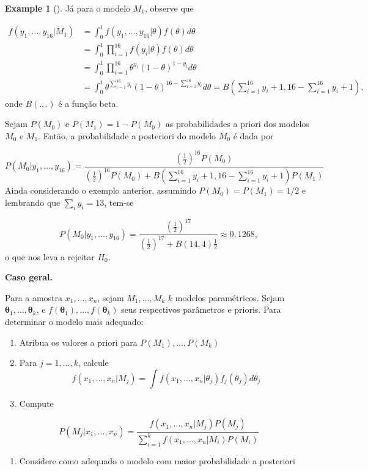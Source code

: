 \documentclass[
  letterpaper,
  DIV=11,
  numbers=noendperiod]{scrreprt}
\providecommand{\tightlist}{%
  \setlength{\itemsep}{0pt}\setlength{\parskip}{0pt}}\usepackage{longtable,booktabs,array}
\theoremstyle{definition}
\theoremstyle{plain}
\theoremstyle{definition}
\newtheorem{example}{Example}[chapter]
\theoremstyle{remark}
\begin{document}
\begin{example}[]
Já para o modelo \(M_1\), observe que

\[\begin{align}f(y_1,\ldots,y_{16}|M_1)&=
\int_0^1 f(y_1,\ldots,y_{16}|\theta)f(\theta)d\theta\\
&=\int_0^1 \prod_{i=1}^{16}f(y_i|\theta)f(\theta)d\theta\\
&=\int_0^1 \prod_{i=1}^{16}\theta^{y_i}(1-\theta)^{1-y_i}d\theta\\
&=\int_0^1\theta^{\sum_{i=1}^{16}y_i}(1-\theta)^{16-\sum_{i=1}^{16}y_i}d\theta=B\left(\sum_{i=1}^{16}y_i+1,16-\sum_{i=1}^{16}y_i+1\right),\end{align}\]
onde \(B(.,.)\) é a função beta.

Sejam \(P(M_0)\) e \(P(M_1)=1-P(M_0)\) as probabilidades a priori dos
modelos \(M_0\) e \(M_1\). Então, a probabilidade a posteriori do modelo
\(M_0\) é dada por

\[P(M_0|y_1,\ldots,y_{16})=\frac{\left(\frac{1}{2}\right)^{16}P(M_0)}{\left(\frac{1}{2}\right)^{16}P(M_0)+B\left(\sum_{i=1}^{16}y_i+1,16-\sum_{i=1}^{16}y_i+1\right)P(M_1)}\]
Ainda considerando o exemplo anterior, assumindo \(P(M_0)=P(M_1)=1/2\) e
lembrando que \(\sum_i y_i=13\), tem-se

\[P(M_0|y_1,\ldots,y_{16})=\frac{\left(\frac{1}{2}\right)^{17}}{\left(\frac{1}{2}\right)^{17}+B\left(14,4\right)\frac{1}{2}}\approx0,1268,\]
o que nos leva a rejeitar \(H_0\).

\textbf{Caso geral.}

Para a amostra \(x_1,\ldots,x_n\), sejam \(M_1,\ldots,M_k\) \(k\)
modelos paramétricos. Sejam
\(\boldsymbol{\theta}_1,\ldots,\boldsymbol{\theta}_k\), e
\(f(\boldsymbol{\theta}_1),\ldots,f(\boldsymbol{\theta}_k)\) seus
respectivos parâmetros e prioris. Para determinar o modelo mais
adequado:

\begin{enumerate}
\def\labelenumi{\arabic{enumi}.}
\item
  Atribua os valores a priori para \(P(M_1),\ldots,P(M_k)\)
\item
  Para \(j=1,\ldots,k\), calcule
  \[f(x_1,\ldots,x_n|M_j)=\int f(x_1,\ldots,x_n|\theta_j)f_j(\theta_j)d\theta_j\]
\item
  Compute
\end{enumerate}

\[P(M_j|x_1,\ldots,x_n)=\frac{f(x_1,\ldots,x_n|M_j)P(M_j)}{\sum_{i=1}^k f(x_1,\ldots,x_n|M_i)P(M_i)}\]

\begin{enumerate}
\def\labelenumi{\arabic{enumi}.}
\setcounter{enumi}{3}
\tightlist
\item
  Considere como adequado o modelo com maior probabilidade a posteriori
\end{enumerate}


\end{example}
\end{document}
